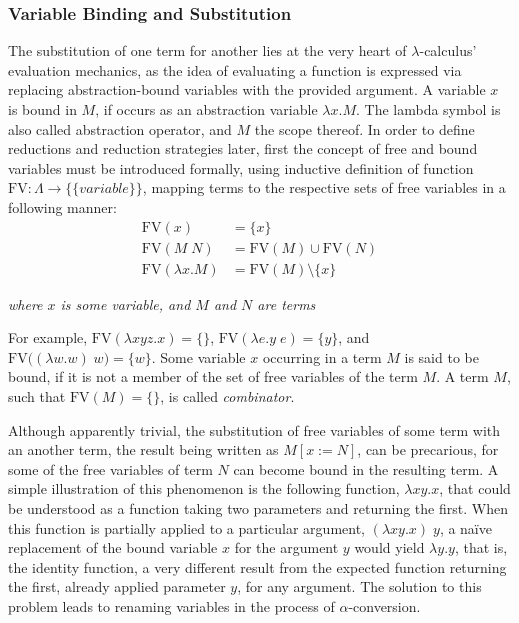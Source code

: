 \documentclass[a4paper,10pt]{article}
\begin{document}
\subsubsection{Variable Binding and Substitution}
The substitution of one term for another lies at the very heart of $\lambda$-calculus'
evaluation mechanics, as the idea of evaluating a function is expressed via replacing
abstraction-bound variables with the provided argument. A variable $x$ is bound in $M$,
if occurs as an abstraction variable $\lambda x.M$. The lambda symbol is also called
abstraction operator, and $M$ the scope thereof. In order to define
reductions and reduction strategies later, first the concept of free
and bound variables must be introduced formally, using inductive definition
of function $\mathrm{FV} : \Lambda \to \big\{\{variable\}\big\}$, mapping 
terms to the respective sets of free variables in a following manner:
\begin{align*}
	\mathrm{FV}(x) &= \{x\} \\
    \mathrm{FV}(M\;N) &= \mathrm{FV}(M) \cup \mathrm{FV}(N) \\
	\mathrm{FV}(\lambda x.M) &= \mathrm{FV}(M) \setminus \{x\}
\end{align*}
\begin{center}
\textit{where $x$ is some variable, and $M$ and $N$ are terms}
\end{center}
For example, $\mathrm{FV}(\lambda x y z.x) = \{\}$, $\mathrm{FV}(\lambda e.y\;e) = \{y\}$,
and $\mathrm{FV}\big((\lambda w.w)\;w\big) = \{w\}$. Some variable $x$ occurring in a term $M$ is
said to be bound, if it is not a member of the set of free variables of the term $M$.
A term $M$, such that $\mathrm{FV}(M) = \{\}$, is called \textit{combinator}.

Although apparently trivial, the substitution of free variables of some term with an another term,
the result being written as $M[x := N]$, can be precarious, for some of the 
free variables of term $N$ can become bound in the resulting term. A simple illustration of this
phenomenon is the following function, $\lambda xy.x$, that could be understood as a function
taking two parameters and returning the first. When this function is partially
applied to a particular argument, $(\lambda xy.x)\;y$, a na\"ive replacement of 
the bound variable $x$ for the argument $y$ would yield
$\lambda y.y$, that is, the identity function, a very different result from the expected function returning
the first, already applied parameter $y$, for any argument. The solution to this problem leads
to renaming variables in the process of $\alpha$-conversion.
\end{document}
